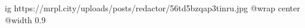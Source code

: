  
 
 
 
 

\ifcmt
  ig https://mrpl.city/uploads/posts/redactor/56td5bzqap3tinru.jpg
  @wrap center
  @width 0.9
\fi
